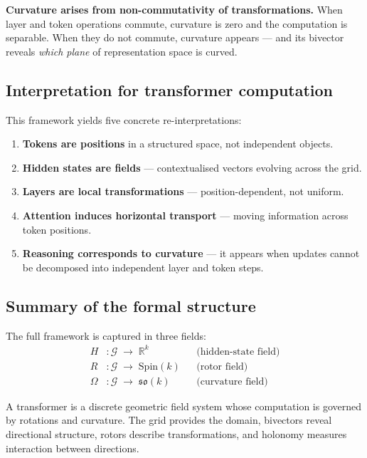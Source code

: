 \documentclass[11pt, twoside, openright]{memoir}
\numberwithin{equation}{chapter}
\begin{document}
\begin{gabox}
\textbf{Curvature arises from non-commutativity of transformations.}
When layer and token operations commute, curvature is zero and the
computation is separable.  When they do not commute, curvature
appears --- and its bivector reveals \emph{which plane} of
representation space is curved.
\end{gabox}

\subsection{Interpretation for transformer computation}

This framework yields five concrete re-interpretations:

\begin{enumerate}[nosep]
\item \textbf{Tokens are positions} in a structured space, not
  independent objects.
\item \textbf{Hidden states are fields} --- contextualised vectors
  evolving across the grid.
\item \textbf{Layers are local transformations} --- position-dependent,
  not uniform.
\item \textbf{Attention induces horizontal transport} --- moving
  information across token positions.
\item \textbf{Reasoning corresponds to curvature} --- it appears when
  updates cannot be decomposed into independent layer and token steps.
\end{enumerate}

\subsection{Summary of the formal structure}

The full framework is captured in three fields:
\begin{equation}
\begin{aligned}
  H &: \mathcal{G} \;\longrightarrow\; \mathbb{R}^k
    &&\text{(hidden-state field)} \\[3pt]
  R &: \mathcal{G} \;\longrightarrow\; \mathrm{Spin}(k)
    &&\text{(rotor field)} \\[3pt]
  \Omega &: \mathcal{G} \;\longrightarrow\; \mathfrak{so}(k)
    &&\text{(curvature field)}
\end{aligned}
\end{equation}

\begin{keyidea}
A transformer is a discrete geometric field system whose computation
is governed by rotations and curvature.  The grid provides the domain,
bivectors reveal directional structure, rotors describe
transformations, and holonomy measures interaction between directions.
\end{keyidea}
\end{document}
